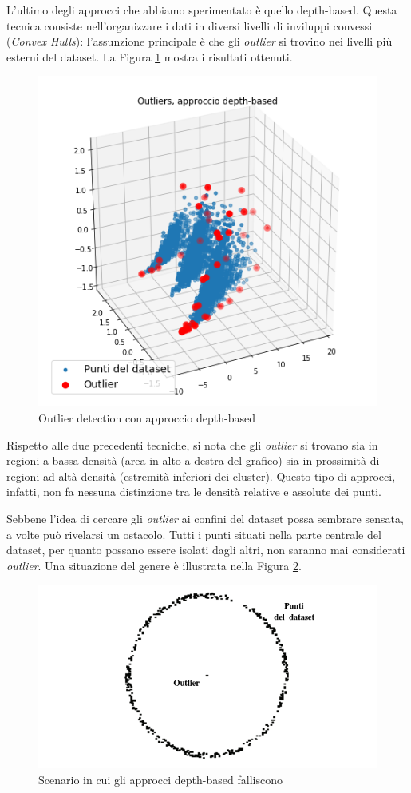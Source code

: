 \documentclass[a4paper]{article}
\begin{document}
L'ultimo degli approcci che abbiamo sperimentato è quello depth-based. Questa tecnica consiste nell'organizzare i dati in diversi livelli di inviluppi convessi (\textit{Convex Hulls}): l'assunzione principale è che gli \textit{outlier} si trovino nei livelli più esterni del dataset. La Figura \ref{fig:depth_based} mostra i risultati ottenuti.

\begin{figure}[h]
\begin{center}

	\includegraphics[width=.32\textwidth]{images/depth_outliers.png}
\caption{Outlier detection con approccio depth-based}
\label{fig:depth_based}
\end{center}
\end{figure}

\noindent
Rispetto alle due precedenti tecniche, si nota che gli \textit{outlier} si trovano sia in regioni a bassa densità (area in alto a destra del grafico) sia in prossimità di regioni ad altà densità (estremità inferiori dei cluster).
Questo tipo di approcci, infatti, non fa nessuna distinzione tra le densità relative e assolute dei punti. 

Sebbene l'idea di cercare gli \textit{outlier} ai confini del dataset possa sembrare sensata, a volte può rivelarsi un ostacolo. Tutti i punti situati nella parte centrale del dataset, per quanto possano essere isolati dagli altri, non saranno mai considerati \textit{outlier}. Una situazione del genere è illustrata nella Figura \ref{fig:depth_counterexample}.

\begin{figure}[h]
\begin{center}

	\includegraphics[width=.62\textwidth]{images/depth_example.png}
\caption{Scenario in cui gli approcci depth-based falliscono}
\label{fig:depth_counterexample}
\end{center}
\end{figure}
\end{document}
